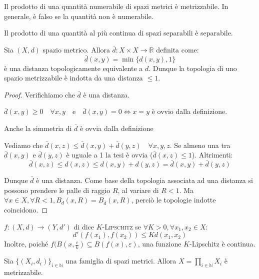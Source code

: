 \begin{nlist}
\item Il prodotto di una quantità numerabile di spazi metrici è metrizzabile. In
generale, è falso se la quantità non è numerabile.
\item Il prodotto di una quantità al più continua di spazi separabili è
separabile.
\end{nlist}
\begin{prop}
	Sia $(X,d)$ spazio metrico. Allora $\bar{d}:X \times X \longrightarrow
	\mathbb{R}$ definita come:
	$$\bar{d}(x,y)=\min \{d(x,y),1\}$$
	è una distanza topologicamente equivalente a $d$. Dunque la topologia di uno
	spazio metrizzabile è indotta da una distanza $\le 1$.
\end{prop}
\begin{proof}
	Verifichiamo che $\bar{d}$ è una distanza. \\
	\begin{nlist}
	\item $\bar{d}(x,y) \ge 0 \quad \forall x,y \quad \text{e} \quad
	\bar{d}(x,y)=0 \Leftrightarrow x=y$ è ovvio dalla definizione.
	\item Anche la simmetria di $\bar{d}$ è ovvia dalla definizione
	\item Vediamo che $\bar{d}(x,z) \le \bar{d}(x,y)+\bar{d}(y,z) \quad \forall
	x,y,z$. Se almeno una tra $\bar{d}(x,y)$ e $\bar{d}(y,z)$ è uguale a 1
	la tesi è ovvia ($\bar{d}(x,z) \le 1$). Altrimenti:
	$$\bar{d}(x,z) \le d(x,z) \le d(x,y)+ d(y,z) =\bar{d}(x,y)+\bar{d}(y,z)$$
	\end{nlist}
	Dunque $\bar{d}$ è una distanza. Come base della topologia associata ad una
	distanza si possono prendere le palle di raggio $R$, al	variare di $R<1$.
	Ma $\forall x \in X, \forall R<1, B_d(x,R)=B_{\bar{d}}(x,R)$, perciò le
	topologie indotte coincidono.
\end{proof}
\begin{defn}
	$f:(X,d) \longrightarrow (Y,d')$ di dice $K$-\textsc{Lipschitz} se $\forall
	K>0,\forall x_1,x_2 \in X$:
	$$d'(f(x_1),f(x_2)) \le Kd(x_1,x_2)$$
	Inoltre, poiché $f(B(x,\frac{\varepsilon}{k}) \subseteq
	B(f(x),\varepsilon)$, una funzione $K$-Lipschitz è continua.
\end{defn}
\begin{thm}
Sia $\{(X_i,d_i)\}_{i \in \mathbb{N}}$ una famiglia di spazi metrici. Allora
$X=\prod _{i \in \mathbb{N}} X_i$ è metrizzabile.
\end{thm}
